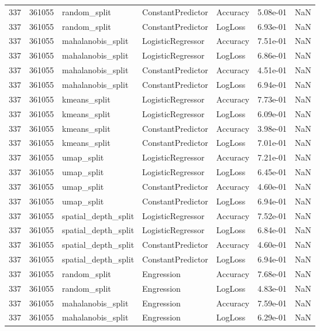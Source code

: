 \begin{tabular}{rrlllrr}
337 & 361055 & random\_split & ConstantPredictor & Accuracy & 5.08e-01 & NaN \\
337 & 361055 & random\_split & ConstantPredictor & LogLoss & 6.93e-01 & NaN \\
337 & 361055 & mahalanobis\_split & LogisticRegressor & Accuracy & 7.51e-01 & NaN \\
337 & 361055 & mahalanobis\_split & LogisticRegressor & LogLoss & 6.86e-01 & NaN \\
337 & 361055 & mahalanobis\_split & ConstantPredictor & Accuracy & 4.51e-01 & NaN \\
337 & 361055 & mahalanobis\_split & ConstantPredictor & LogLoss & 6.94e-01 & NaN \\
337 & 361055 & kmeans\_split & LogisticRegressor & Accuracy & 7.73e-01 & NaN \\
337 & 361055 & kmeans\_split & LogisticRegressor & LogLoss & 6.09e-01 & NaN \\
337 & 361055 & kmeans\_split & ConstantPredictor & Accuracy & 3.98e-01 & NaN \\
337 & 361055 & kmeans\_split & ConstantPredictor & LogLoss & 7.01e-01 & NaN \\
337 & 361055 & umap\_split & LogisticRegressor & Accuracy & 7.21e-01 & NaN \\
337 & 361055 & umap\_split & LogisticRegressor & LogLoss & 6.45e-01 & NaN \\
337 & 361055 & umap\_split & ConstantPredictor & Accuracy & 4.60e-01 & NaN \\
337 & 361055 & umap\_split & ConstantPredictor & LogLoss & 6.94e-01 & NaN \\
337 & 361055 & spatial\_depth\_split & LogisticRegressor & Accuracy & 7.52e-01 & NaN \\
337 & 361055 & spatial\_depth\_split & LogisticRegressor & LogLoss & 6.84e-01 & NaN \\
337 & 361055 & spatial\_depth\_split & ConstantPredictor & Accuracy & 4.60e-01 & NaN \\
337 & 361055 & spatial\_depth\_split & ConstantPredictor & LogLoss & 6.94e-01 & NaN \\
337 & 361055 & random\_split & Engression & Accuracy & 7.68e-01 & NaN \\
337 & 361055 & random\_split & Engression & LogLoss & 4.83e-01 & NaN \\
337 & 361055 & mahalanobis\_split & Engression & Accuracy & 7.59e-01 & NaN \\
337 & 361055 & mahalanobis\_split & Engression & LogLoss & 6.29e-01 & NaN \\

\end{tabular}
